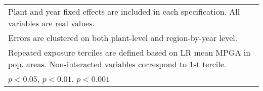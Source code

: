 \begin{table}[htbp]
\begin{tabular}{l*{6}{c}}
\multicolumn{7}{l}{\footnotesize Plant and year fixed effects are included in each specification. All variables are real values.}\\
\multicolumn{7}{l}{\footnotesize Errors are clustered on both plant-level and region-by-year level.}\\
\multicolumn{7}{l}{\footnotesize Repeated exposure terciles are defined based on LR mean MPGA in pop. areas. Non-interacted variables correspond to 1st tercile.}\\
\multicolumn{7}{l}{\footnotesize \sym{*} \(p<0.05\), \sym{**} \(p<0.01\), \sym{***} \(p<0.001\)}\\
\end{tabular}
\end{table}

